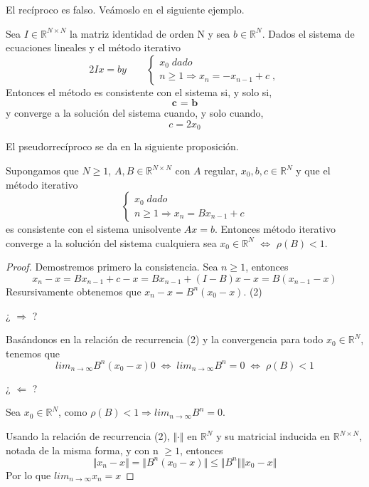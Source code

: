 El recíproco es falso. Veámoslo en el siguiente ejemplo.

\begin{ejemplo} Sea $I \in \mathbb{R}^{N \times N}$ la matriz identidad de orden N y sea $b \in \mathbb{R}^N$. Dados el sistema de ecuaciones lineales y el método iterativo
\[
2Ix = b y \qquad \left\{ \begin{array}{c}
x_0 \; dado \\
n \geq 1 \Rightarrow x_n = -x_{n-1}+c \; ,
\end{array}
\right.
\]
Entonces el método es consistente con el sistema si, y solo si,
\[ \textbf{c = b} \]
y converge a la solución del sistema cuando, y solo cuando,
\[ c = 2x_0 \]
\end{ejemplo}

El pseudorrecíproco se da en la siguiente proposición.

\begin{nprop}
Supongamos que $N \geq 1$, $A,B \in \mathbb{R}^{N \times N}$ con $A$ regular, $x_0,b,c \in \mathbb{R}^N$ y que el método iterativo
\[ \left\{ \begin{array}{c}
x_0 \; dado \\
n \geq 1 \Rightarrow x_n = Bx_{n-1}+c
\end{array}
\right. \]
es consistente con el sistema unisolvente $Ax = b$. Entonces método iterativo converge a la solución del sistema cualquiera sea $x_0 \in \mathbb{R}^N$ $\Leftrightarrow$ $\rho (B) < 1$.
\end{nprop}

	\begin{proof}
	Demostremos primero la consistencia. Sea $n \geq 1$, entonces
	\[ x_n - x = Bx_{n-1} + c - x = Bx_{n-1} + (I - B)x - x = B(x_{n-1} - x) \]
	Resursivamente obtenemos que $x_n - x = B^n (x_0 - x)$. (2)
	
	¿ $\Rightarrow$ ?
	
	Basándonos en la relación de recurrencia (2) y la convergencia para todo $x_0 \in \mathbb{R}^N$, tenemos que
	\[ lim_{n \rightarrow \infty} B^n(x_0 - x) 0 
	\; \Leftrightarrow \; 
	lim_{n \rightarrow \infty} B^n = 0
	\; \Leftrightarrow \;
	\rho (B) < 1 \]
	
	¿ $\Leftarrow$ ?
	
	Sea $x_0 \in \mathbb{R}^N$, como $\rho (B) < 1 \Rightarrow lim_{n \rightarrow \infty} B^n = 0$.
	
	Usando la relación de recurrencia (2), $\Vert \cdot \Vert$ en $\mathbb{R}^N$ y su matricial inducida en $\mathbb{R}^{N \times N}$, notada de la misma forma, y con n $\geq 1$, entonces
	\[ \Vert x_n - x \Vert = \Vert B^n(x_0-x) \Vert \leq \Vert B^n \Vert \Vert x_0 - x \Vert \]
	Por lo que $lim_{n \rightarrow \infty}x_n = x$
	\end{proof}
	
